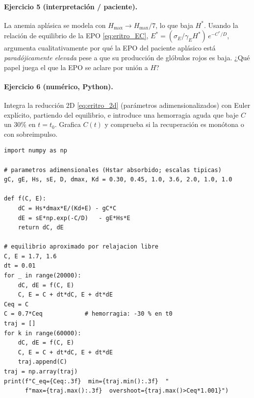 \paragraph{Ejercicio 5 (interpretación / paciente).} La anemia aplásica se modela con $H_{\max}\to H_{\max}/7$, lo que baja $H^*$. Usando la relación de equilibrio de la EPO \eqref{eq:eritro_EC}, $E^* = (\sigma_E/\gamma_E H^*)\,e^{-C^*/D}$, argumenta cualitativamente por qué la EPO del paciente aplásico está \emph{paradójicamente elevada} pese a que su producción de glóbulos rojos es baja. ¿Qué papel juega el que la EPO se aclare por unión a $H$?

\paragraph{Ejercicio 6 (numérico, Python).} Integra la reducción 2D \eqref{eq:eritro_2d} (parámetros adimensionalizados) con Euler explícito, partiendo del equilibrio, e introduce una hemorragia aguda que baje $C$ un $30\%$ en $t=t_0$. Grafica $C(t)$ y comprueba si la recuperación es monótona o con sobreimpulso.
\begin{verbatim}
import numpy as np

# parametros adimensionales (Hstar absorbido; escalas tipicas)
gC, gE, Hs, sE, D, dmax, Kd = 0.30, 0.45, 1.0, 3.6, 2.0, 1.0, 1.0

def f(C, E):
    dC = Hs*dmax*E/(Kd+E) - gC*C
    dE = sE*np.exp(-C/D)   - gE*Hs*E
    return dC, dE

# equilibrio aproximado por relajacion libre
C, E = 1.7, 1.6
dt = 0.01
for _ in range(20000):
    dC, dE = f(C, E)
    C, E = C + dt*dC, E + dt*dE
Ceq = C
C = 0.7*Ceq            # hemorragia: -30 % en t0
traj = []
for k in range(60000):
    dC, dE = f(C, E)
    C, E = C + dt*dC, E + dt*dE
    traj.append(C)
traj = np.array(traj)
print(f"C_eq={Ceq:.3f}  min={traj.min():.3f}  "
      f"max={traj.max():.3f}  overshoot={traj.max()>Ceq*1.001}")
\end{verbatim}

